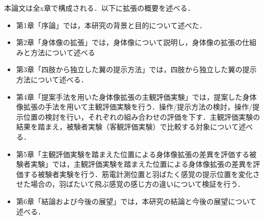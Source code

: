         本論文は全x章で構成される．以下に拡張の概要を述べる．

        \begin{itemize}
                \item 第1章「序論」では，本研究の背景と目的について述べた．
                \item 第2章「身体像の拡張」では，身体像について説明し，身体像の拡張の仕組みと方法について述べる
                \item 第3章「四肢から独立した翼の提示方法」では，四肢から独立した翼の提示方法について述べる．
                \item 第4章「提案手法を用いた身体像拡張の主観評価実験」では，提案した身体像拡張の手法を用いて主観評価実験を行う．操作/提示方法の検討，操作/提示位置の検討を行い，それぞれの組み合わせの評価を下す．主観評価実験の結果を踏まえ，被験者実験（客観評価実験）で比較する対象について述べる．
                \item 第5章「主観評価実験を踏まえた位置による身体像拡張の差異を評価する被験者実験」では，主観評価実験を踏まえた位置による身体像拡張の差異を評価する被験者実験を行う．筋電計測位置と羽ばたく感覚の提示位置を変化させた場合の，羽ばたいて飛ぶ感覚の感じ方の違いについて検証を行う．
                \item 第6章「結論および今後の展望」では，本研究の結論と今後の展望について述べる．
        \end{itemize}
        


        
